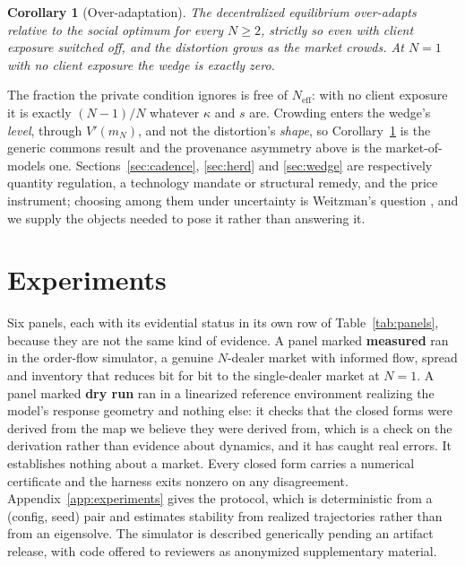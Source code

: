 \documentclass{article}
\theoremstyle{plain}
\newtheorem{corollary}[theorem]{Corollary}
\theoremstyle{definition}
\newcommand{\Neff}{N_{\mathrm{eff}}}
\newcommand{\mN}{m_N}
\begin{document}
\begin{corollary}[Over-adaptation]
\label{cor:over}
The decentralized equilibrium over-adapts relative to the social optimum for every $N \geq 2$, strictly so even with client exposure switched off, and the distortion grows as the market crowds. At $N=1$ with no client exposure the wedge is exactly zero.
\end{corollary}

The fraction the private condition ignores is free of $\Neff$: with no client exposure it is exactly $(N-1)/N$ whatever $\kappa$ and $s$ are. Crowding enters the wedge's \emph{level}, through $V'(\mN)$, and not the distortion's \emph{shape}, so Corollary~\ref{cor:over} is the generic commons result and the provenance asymmetry above is the market-of-models one. Sections~\ref{sec:cadence}, \ref{sec:herd} and \ref{sec:wedge} are respectively quantity regulation, a technology mandate or structural remedy, and the price instrument; choosing among them under uncertainty is Weitzman's question \citep{weitzman1974}, and we supply the objects needed to pose it rather than answering it.



\section{Experiments}
\label{sec:experiments}

Six panels, each with its evidential status in its own row of Table~\ref{tab:panels}, because they are not the same kind of evidence. A panel marked \textbf{measured} ran in the order-flow simulator, a genuine $N$-dealer market with informed flow, spread and inventory that reduces bit for bit to the single-dealer market at $N=1$. A panel marked \textbf{dry run} ran in a linearized reference environment realizing the model's response geometry and nothing else: it checks that the closed forms were derived from the map we believe they were derived from, which is a check on the derivation rather than evidence about dynamics, and it has caught real errors. It establishes nothing about a market. Every closed form carries a numerical certificate and the harness exits nonzero on any disagreement. Appendix~\ref{app:experiments} gives the protocol, which is deterministic from a (config, seed) pair and estimates stability from realized trajectories rather than from an eigensolve. The simulator is described generically pending an artifact release, with code offered to reviewers as anonymized supplementary material.
\end{document}
